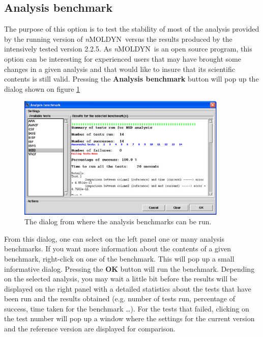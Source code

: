 \documentclass[a4paper,11pt]{report}
\newcommand{\NMOLDYN}{\textit{n}MOLDYN}
\begin{document}
\subsection{Analysis benchmark}
\label{analysis_benchmark}
The purpose of this option is to test the stability of most of the analysis provided by the running version of 
\NMOLDYN\ versus the results produced by the intensively tested version 2.2.5. As \NMOLDYN\ is an open source program, 
this option can be interesting for experienced users that may have brought some changes in a given analysis and that 
would like to insure that its scientific contents is still valid.
\newpage
Pressing the \textbf{Analysis benchmark} button will pop up the dialog shown on figure \ref{fig:benchmark}
\begin{figure}[h!]
\begin{center}
\includegraphics[width=10cm]{Figures/benchmark.eps}
\end{center}
\caption[The analysis benchmark dialog]{The dialog from where the analysis benchmarks can be run.}
\label{fig:benchmark}
\end{figure}

From this dialog, one can select on the left panel one or many analysis benchmarks. If you want more information about 
the contents of a given benchmark, right-click on one of the benchmark. This will pop up a small informative dialog. 
Pressing the \textbf{OK} button will run the benchmark. Depending on the selected analysis, you may wait a little bit before the 
results will be displayed on the right panel with a detailed statistics about the tests that have been run and the results 
obtained (e.g. number of tests run, percentage of success, time taken for the benchmark \ldots ). For the tests that 
failed, clicking on the test number will pop up a window where the settings for the current version and the reference version 
are displayed for comparison.
\end{document}
